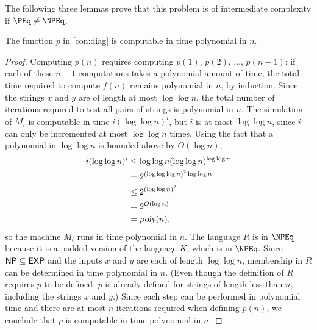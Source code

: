 The following three lemmas prove that this problem is of intermediate complexity if $\PEq \neq \NPEq$.

\begin{lemma}
  The function $p$ in \autoref{con:diag} is computable in time polynomial in $n$.
\end{lemma}
\begin{proof}
  Computing $p(n)$ requires computing $p(1)$, $p(2)$, $\dotsc$, $p(n - 1)$; if each of these $n - 1$ computations takes a polynomial amount of time, the total time required to compute $f(n)$ remains polynomial in $n$, by induction.
  Since the strings $x$ and $y$ are of length at most $\log \log n$, the total number of iterations required to test all pairs of strings is polynomial in $n$.
  The simulation of $M_i$ is computable in time $i (\log \log n)^i$, but $i$ is at most $\log \log n$, since $i$ can only be incremented at most $\log \log n$ times.
  Using the fact that a polynomial in $\log \log n$ is bounded above by $O(\log n)$,
  \begin{align*}
    i (\log \log n)^i & \leq \log \log n (\log \log n)^{\log \log n} \\
    & = 2^{(\log \log \log n)^2 \log \log n } \\
    & \leq 2^{(\log \log n)^2} \\
    & = 2^{O(\log n)} \\
    & = {\textsl{poly}}(n),
  \end{align*}
  so the machine $M_i$ runs in time polynomial in $n$.
  The language $R$ is in $\NPEq$ because it is a padded version of the language $K$, which is in $\NPEq$.
  Since ${\mathsf{NP}} \subseteq {\ensuremath{\mathsf{EXP}}}$ and the inputs $x$ and $y$ are each of length $\log \log n$, membership in $R$ can be determined in time polynomial in $n$.
  (Even though the definition of $R$ requires $p$ to be defined, $p$ is already defined for strings of length less than $n$, including the strings $x$ and $y$.)
  Since each step can be performed in polynomial time and there are at most $n$ iterations required when defining $p(n)$, we conclude that $p$ is computable in time polynomial in $n$.
\end{proof}


